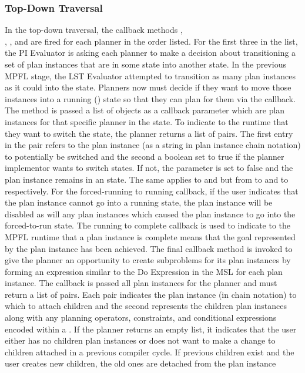 
\subsubsection{Top-Down Traversal}
In the top-down traversal, the callback methods ,\\ , , and  are fired for each planner in the order listed. For the first three in the list, the PI Evaluator is asking each planner to make a decision about transitioning a set of plan instances that are in some state into another state. In the previous MPFL stage, the LST Evaluator attempted to transition as many plan instances as it could into the  state. Planners now must decide if they want to move those instances into a running () state so that they can plan for them via the  callback. The method is passed a list of  objects as a callback parameter which are plan instances for that specific planner in the  state. To indicate to the runtime that they want to switch the state, the planner returns a list of  pairs. The first entry in the pair refers to the plan instance (as a string in plan instance chain notation) to potentially be switched and the second a boolean set to true if the planner implementor wants to switch states. If not, the parameter is set to false and the plan instance remains in an  state. The same applies to  and  but from  to  and  to  respectively. For the forced-running to running callback, if the user indicates that the plan instance cannot go into a running state, the plan instance will be disabled as will any plan instances which caused the plan instance to go into the forced-to-run state. The running to complete callback is used to indicate to the MPFL runtime that a plan instance is complete means that the goal represented by the plan instance has been achieved. The final callback method  is invoked to give the planner an opportunity to create subproblems for its plan instances by forming an expression similar to the Do Expression in the MSL for each plan instance. The callback is passed all plan instances for the planner and must return a list of  pairs. Each pair indicates the plan instance (in chain notation) to which to attach children and the second represents the children plan instances along with any planning operators, constraints, and conditional expressions encoded within a . If the planner returns an empty list, it indicates that the user either has no children plan instances or does not want to make a change to children attached in a previous compiler cycle. If previous children exist and the user creates new children, the old ones are detached from the plan instance 